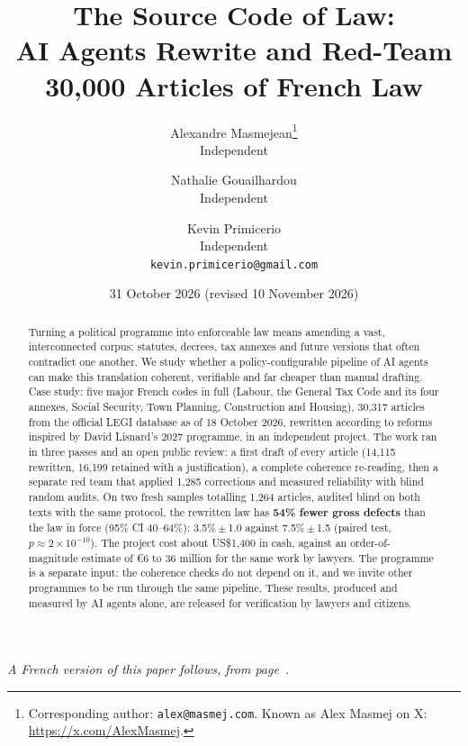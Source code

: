 \documentclass[11pt,a4paper]{article}
\title{The Source Code of Law:\\
AI Agents Rewrite and Red-Team\\
30{,}000 Articles of French Law}
\author{
  Alexandre Masmejean\thanks{Corresponding author: \texttt{alex@masmej.com}. Known as Alex Masmej on X: \url{https://x.com/AlexMasmej}.}\\
  \small Independent
  \and
  Nathalie Gouailhardou\\
  \small Independent
  \and
  Kevin Primicerio\\
  \small Independent\\
  \small\texttt{kevin.primicerio@gmail.com}
}
\date{31 October 2026 (revised 10 November 2026)}
\begin{document}
\maketitle

\begin{center}\small\emph{A French version of this paper follows, from page~\pageref{fr:start}.}\end{center}

\begin{abstract}
Turning a political programme into enforceable law means amending a vast, interconnected corpus: statutes, decrees, tax annexes and future versions that often contradict one another. We study whether a policy-configurable pipeline of AI agents can make this translation coherent, verifiable and far cheaper than manual drafting. Case study: five major French codes in full (Labour, the General Tax Code and its four annexes, Social Security, Town Planning, Construction and Housing), 30{,}317 articles from the official LEGI database as of 18 October 2026, rewritten according to reforms inspired by David Lisnard's 2027 programme, in an independent project. The work ran in three passes and an open public review: a first draft of every article (14{,}115 rewritten, 16{,}199 retained with a justification), a complete coherence re-reading, then a separate red team that applied 1{,}285 corrections and measured reliability with blind random audits. On two fresh samples totalling 1{,}264 articles, audited blind on both texts with the same protocol, the rewritten law has \textbf{54\% fewer gross defects} than the law in force (95\% CI 40--64\%): 3.5\%\,$\pm$\,1.0 against 7.5\%\,$\pm$\,1.5 (paired test, $p \approx 2\times10^{-10}$). The project cost about US\$1{,}400 in cash, against an order-of-magnitude estimate of \euro{}6 to 36 million for the same work by lawyers. The programme is a separate input: the coherence checks do not depend on it, and we invite other programmes to be run through the same pipeline. These results, produced and measured by AI agents alone, are released for verification by lawyers and citizens.
\end{abstract}

\begin{center}
\end{center}
\end{document}
